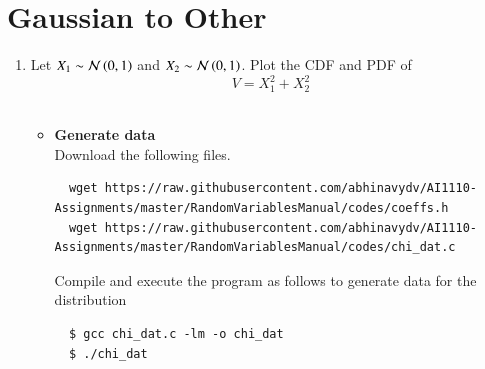 \documentclass[journal,12pt,twocolumn]{IEEEtran}
\renewcommand\thesection{\arabic{section}}
\begin{document}
\section{Gaussian to Other}
\begin{enumerate}[label=\thesection.\arabic*
        ,ref=\thesection.\theenumi]
    \item
          Let $X_1 \sim  \mathcal{N}\left(0,1\right)$ and $X_2 \sim  \mathcal{N}\left(0,1\right)$. Plot the CDF and PDF of
          \begin{equation}
              V = X_1^2 + X_2^2
          \end{equation}\\
          \solution
          \begin{itemize}
              \item \textbf{Generate data}\\
                    Download the following files.
                    \begin{lstlisting}
  wget https://raw.githubusercontent.com/abhinavydv/AI1110-Assignments/master/RandomVariablesManual/codes/coeffs.h
  wget https://raw.githubusercontent.com/abhinavydv/AI1110-Assignments/master/RandomVariablesManual/codes/chi_dat.c
          \end{lstlisting}

                    Compile and execute the program as follows to generate data for the distribution
                    \begin{lstlisting}
  $ gcc chi_dat.c -lm -o chi_dat
  $ ./chi_dat
          \end{lstlisting}


\end{itemize}
\end{enumerate}
\end{document}
